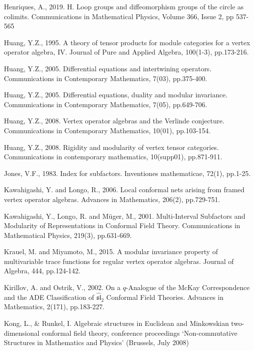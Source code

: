 \documentclass[11pt,b5paper,notitlepage]{article}
\theoremstyle{definition}
\theoremstyle{plain}
\newcommand{\fk}{\mathfrak}
\newcommand{\wht}{\widehat}
\numberwithin{equation}{subsection}
\begin{document}
\begin{thebibliography}{999999}
Henriques, A., 2019. H. Loop groups and diffeomorphism groups of the circle as colimits. Communications in Mathematical Physics,  Volume 366, Issue 2, pp 537-565

Huang, Y.Z., 1995. A theory of tensor products for module categories for a vertex operator algebra, IV. Journal of Pure and Applied Algebra, 100(1-3), pp.173-216.

Huang, Y.Z., 2005. Differential equations and intertwining operators. Communications in Contemporary Mathematics, 7(03), pp.375-400.

Huang, Y.Z., 2005. Differential equations, duality and modular invariance. Communications in Contemporary Mathematics, 7(05), pp.649-706.

Huang, Y.Z., 2008. Vertex operator algebras and the Verlinde conjecture. Communications in Contemporary Mathematics, 10(01), pp.103-154.

Huang, Y.Z., 2008. Rigidity and modularity of vertex tensor categories. Communications in contemporary mathematics, 10(supp01), pp.871-911.

Jones, V.F., 1983. Index for subfactors. Inventiones mathematicae, 72(1), pp.1-25.

Kawahigashi, Y. and Longo, R., 2006. Local conformal nets arising from framed vertex operator algebras. Advances in Mathematics, 206(2), pp.729-751.

Kawahigashi, Y., Longo, R. and M\"uger, M., 2001. Multi-Interval Subfactors and Modularity of Representations in Conformal Field Theory. Communications in Mathematical Physics, 219(3), pp.631-669.

Krauel, M. and Miyamoto, M., 2015. A modular invariance property of multivariable trace functions for regular vertex operator algebras. Journal of Algebra, 444, pp.124-142.

Kirillov, A. and Ostrik, V., 2002. On a $q$-Analogue of the McKay Correspondence and the ADE Classification of $\wht{\fk{sl}}_2$ Conformal Field Theories. Advances in Mathematics, 2(171), pp.183-227.

Kong, L., \& Runkel, I. Algebraic structures in Euclidean and Minkowskian two-dimensional conformal field theory, conference proceedings `Non-commutative Structures in Mathematics and Physics' (Brussels, July 2008)



\end{thebibliography}
\end{document}
